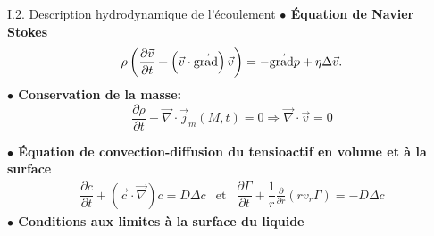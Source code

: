 \documentclass[aspectratio=169,10pt]{beamer}
\begin{document}
  \begin{frame}{I.2. Description hydrodynamique de l'écoulement}
    \noindent \textbf{$\bullet$  Équation de Navier Stokes}
      \begin{equation}
        \rho\left(\dfrac{\partial \vec{v}}{\partial t}+\left(\vec{v}\cdot\vec{\rm grad}\right)\vec{v}\right)=-\vec{\rm grad}p+\eta\Delta\vec{v}.\label{eq:NS1}
      \end{equation}
  \noindent \textbf{$\bullet$ Conservation de la masse:}
    \begin{equation}
    \dfrac{\partial \rho}{\partial t}+\vec{\nabla}\cdot\vec{j}_m(M,t)=0\Rightarrow\vec{\nabla}\cdot \vec{v} = 0
  \end{equation} 

  \noindent \textbf{$\bullet$ Équation de convection-diffusion du tensioactif en volume et à la surface}
    \begin{equation}
      \begin{array}{ccc}      
  \dfrac{\partial c}{\partial t}+\left(\vec{c}\cdot \vec{\nabla}\right)c = D\Delta c & \text{et} &  \dfrac{\partial \Gamma}{\partial t}+\dfrac{1}{r}\frac{\partial }{\partial r}\left(rv_r\Gamma\right) = -D\Delta c 
      \end{array}
\end{equation}
  \noindent\textbf{$\bullet$  Conditions aux limites à la surface du liquide} %
    \begin{figure}
      \centering
    \end{figure}

  \end{frame}
\end{document}
